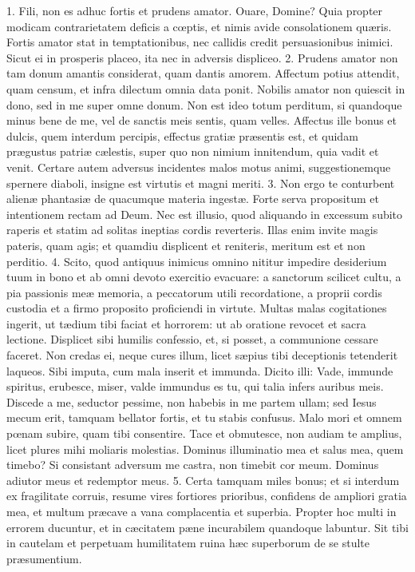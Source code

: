 1. Fili, non es adhuc fortis et prudens amator.
Ouare, Domine?
Quia propter modicam contrarietatem deficis a cœptis, et nimis avide consolationem quæris. Fortis amator stat in temptationibus, nec callidis credit persuasionibus inimici. Sicut ei in prosperis placeo, ita nec in adversis displiceo.
2. Prudens amator non tam donum amantis considerat, quam dantis amorem. Affectum potius attendit, quam censum, et infra dilectum omnia data ponit. Nobilis amator non quiescit in dono, sed in me super omne donum. Non est ideo totum perditum, si quandoque minus bene de me, vel de sanctis meis sentis, quam velles. Affectus ille bonus et dulcis, quem interdum percipis, effectus gratiæ præsentis est, et quidam prægustus patriæ cælestis, super quo non nimium innitendum, quia vadit et venit. Certare autem adversus incidentes malos motus animi, suggestionemque spernere diaboli, insigne est virtutis et magni meriti.
3. Non ergo te conturbent alienæ phantasiæ de quacumque materia ingestæ. Forte serva propositum et intentionem rectam ad Deum. Nec est illusio, quod aliquando in excessum subito raperis et statim ad solitas ineptias cordis reverteris. Illas enim invite magis pateris, quam agis; et quamdiu displicent et reniteris, meritum est et non perditio.
4. Scito, quod antiquus inimicus omnino nititur impedire desiderium tuum in bono et ab omni devoto exercitio evacuare: a sanctorum scilicet cultu, a pia passionis meæ memoria, a peccatorum utili recordatione, a proprii cordis custodia et a firmo proposito proficiendi in virtute. Multas malas cogitationes ingerit, ut tædium tibi faciat et horrorem: ut ab oratione revocet et sacra lectione. Displicet sibi humilis confessio, et, si posset, a communione cessare faceret. Non credas ei, neque cures illum, licet sæpius tibi deceptionis tetenderit laqueos. Sibi imputa, cum mala inserit et immunda. Dicito illi: Vade, immunde spiritus, erubesce, miser, valde immundus es tu, qui talia infers auribus meis. Discede a me, seductor pessime, non habebis in me partem ullam; sed Iesus mecum erit, tamquam bellator fortis, et tu stabis confusus. Malo mori et omnem pœnam subire, quam tibi consentire. Tace et obmutesce, non audiam te amplius, licet plures mihi moliaris molestias. Dominus illuminatio mea et salus mea, quem timebo? Si consistant adversum me castra, non timebit cor meum. Dominus adiutor meus et redemptor meus.
5. Certa tamquam miles bonus; et si interdum ex fragilitate corruis, resume vires fortiores prioribus, confidens de ampliori gratia mea, et multum præcave a vana complacentia et superbia. Propter hoc multi in errorem ducuntur, et in cæcitatem pæne incurabilem quandoque labuntur. Sit tibi in cautelam et perpetuam humilitatem ruina hæc superborum de se stulte præsumentium.


